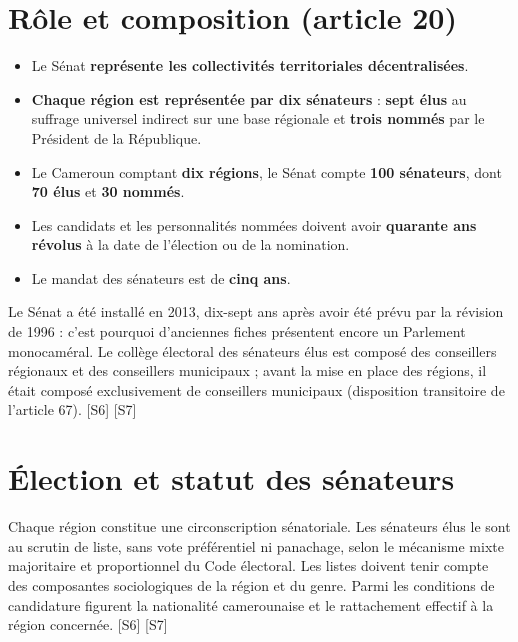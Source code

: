 \documentclass[11pt,a4paper,oneside]{report}
\newcommand{\src}[1]{\textcolor{bluec}{\scriptsize[#1]}}
\begin{document}
\section{Rôle et composition (article 20)}
\begin{itemize}
  \item Le Sénat \textbf{représente les collectivités territoriales décentralisées}.
  \item \textbf{Chaque région est représentée par dix sénateurs} : \textbf{sept élus} au suffrage universel indirect sur une base régionale et \textbf{trois nommés} par le Président de la République.
  \item Le Cameroun comptant \textbf{dix régions}, le Sénat compte \textbf{100 sénateurs}, dont \textbf{70 élus} et \textbf{30 nommés}.
  \item Les candidats et les personnalités nommées doivent avoir \textbf{quarante ans révolus} à la date de l'élection ou de la nomination.
  \item Le mandat des sénateurs est de \textbf{cinq ans}.
\end{itemize}
Le Sénat a été installé en 2013, dix-sept ans après avoir été prévu par la révision de 1996 : c'est pourquoi d'anciennes fiches présentent encore un Parlement monocaméral. Le collège électoral des sénateurs élus est composé des conseillers régionaux et des conseillers municipaux ; avant la mise en place des régions, il était composé exclusivement de conseillers municipaux (disposition transitoire de l'article 67). \src{S6} \src{S7}

\section{Élection et statut des sénateurs}
Chaque région constitue une circonscription sénatoriale. Les sénateurs élus le sont au scrutin de liste, sans vote préférentiel ni panachage, selon le mécanisme mixte majoritaire et proportionnel du Code électoral. Les listes doivent tenir compte des composantes sociologiques de la région et du genre. Parmi les conditions de candidature figurent la nationalité camerounaise et le rattachement effectif à la région concernée. \src{S6} \src{S7}
\end{document}
